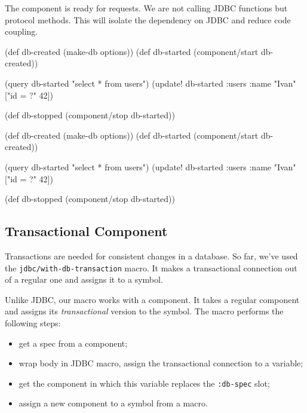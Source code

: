 \fi

The component is ready for requests. We are not calling JDBC functions but protocol methods. This will isolate the dependency on JDBC and reduce code coupling.

\ifnarrow

\begin{english}
  \begin{clojure}
(def db-created (make-db options))
(def db-started
  (component/start db-created))

(query db-started "select * from users")
(update! db-started
  :users {:name "Ivan"} ["id = ?" 42])

(def db-stopped
  (component/stop db-started))
  \end{clojure}
\end{english}

\else

\begin{english}
  \begin{clojure}
(def db-created (make-db options))
(def db-started (component/start db-created))

(query db-started "select * from users")
(update! db-started :users {:name "Ivan"} ["id = ?" 42])

(def db-stopped (component/stop db-started))
  \end{clojure}
\end{english}

\fi

\subsection{Transactional Component}


Transactions are needed for consistent changes in a database. So far, we've used the \verb|jdbc/with-db-transaction| macro. It makes a transactional connection out of a regular one and assigns it to a symbol.

Unlike JDBC, our macro works with a component. It takes a regular component and assigns its \emph{transactional} version to the symbol. The macro performs the following steps:

\begin{itemize}

\item
  get a spec from a component;

\item
  wrap body in JDBC macro, assign the transactional connection to a variable;

\item
  get the component in which this variable replaces the \verb|:db-spec| slot;

\item
  assign a new component to a symbol from a macro.

\end{itemize}

